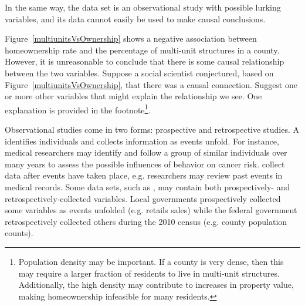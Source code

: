 In the same way, the  data set is an observational study with possible lurking variables, and its data cannot easily be used to make causal conclusions.

\begin{exercise}
Figure~\ref{multiunitsVsOwnership} shows a negative association between homeownership rate and the percentage of multi-unit structures in a county. However, it is unreasonable to conclude that there is some causal relationship between the two variables. Suppose a social scientist conjectured, based on Figure~\ref{multiunitsVsOwnership}, that there was a causal connection. Suggest one or more other variables that might explain the relationship we see. One explanation is provided in the footnote\footnote{Population density may be important. If a county is very dense, then this may require a larger fraction of residents to live in multi-unit structures. Additionally, the high density may contribute to increases in property value, making homeownership infeasible for many residents.}.
\end{exercise}

Observational studies come in two forms: prospective and retrospective studies. A  identifies individuals and collects information as events unfold. For instance, medical researchers may identify and follow a group of similar individuals over many years to assess the possible influences of behavior on cancer risk.  collect data after events have taken place, e.g. researchers may review past events in medical records. Some data sets, such as , may contain both prospectively- and retrospectively-collected variables. Local governments prospectively collected some variables as events unfolded (e.g. retails sales) while the federal government retrospectively collected others during the 2010 census (e.g. county population counts). %

